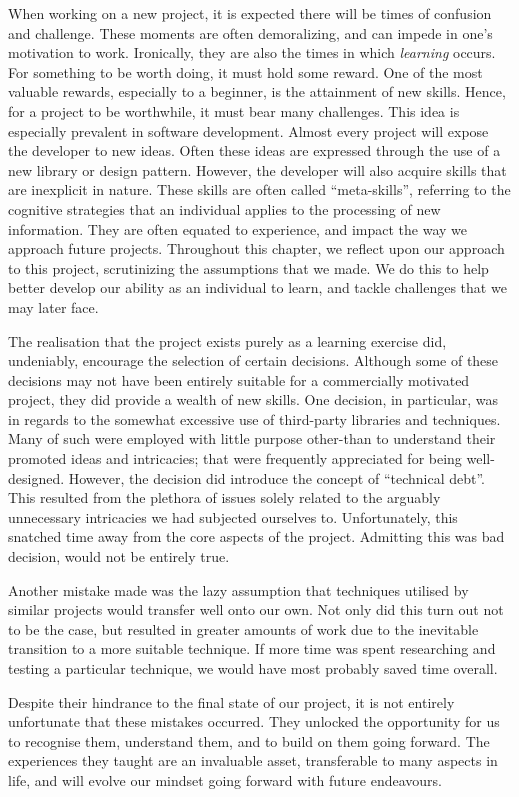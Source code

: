\documentclass{standalone}
\begin{document}
	When working on a new project, it is expected there will be times of confusion and challenge. These moments are often demoralizing, and can impede in one's motivation to work. Ironically, they are also the times in which \emph{learning} occurs. For something to be worth doing, it must hold some reward. One of the most valuable rewards, especially to a beginner, is the attainment of new skills. Hence, for a project to be worthwhile, it must bear many challenges. This idea is especially prevalent in software development. Almost every project will expose the developer to new ideas. Often these ideas are expressed through the use of a new library or design pattern. However, the developer will also acquire skills that are inexplicit in nature. These skills are often called \enquote{meta-skills}, referring to the cognitive strategies that an individual applies to the processing of new information. They are often equated to experience, and impact the way we approach future projects. Throughout this chapter, we reflect upon our approach to this project, scrutinizing the assumptions that we made. We do this to help better develop our ability as an individual to learn, and tackle challenges that we may later face.

	The realisation that the project exists purely as a learning exercise did, undeniably, encourage the selection of certain decisions. Although some of these decisions may not have been entirely suitable for a commercially motivated project, they did provide a wealth of new skills. One decision, in particular, was in regards to the somewhat excessive use of third-party libraries and techniques. Many of such were employed with little purpose other-than to understand their promoted ideas and intricacies; that were frequently appreciated for being well-designed. However, the decision did introduce the concept of \enquote{technical debt}. This resulted from the plethora of issues solely related to the arguably unnecessary intricacies we had subjected ourselves to. Unfortunately, this snatched time away from the core aspects of the project. Admitting this was bad decision, would not be entirely true.

	Another mistake made was the lazy assumption that techniques utilised by similar projects would transfer well onto our own. Not only did this turn out not to be the case, but resulted in greater amounts of work due to the inevitable transition to a more suitable technique. If more time was spent researching and testing a particular technique, we would have most probably saved time overall.

	Despite their hindrance to the final state of our project, it is not entirely unfortunate that these mistakes occurred. They unlocked the opportunity for us to recognise them, understand them, and to build on them going forward. The experiences they taught are an invaluable asset, transferable to many aspects in life, and will evolve our mindset going forward with future endeavours.
\end{document}
